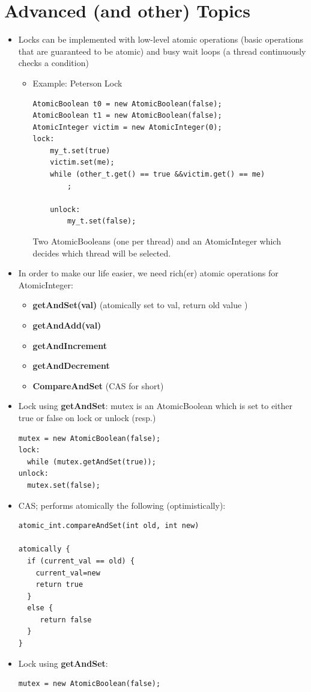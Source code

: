 \documentclass[a4paper]{article}
\begin{document}
\section{Advanced (and other) Topics}
\begin{itemize}
\item Locks can be implemented with low-level atomic operations (basic operations that are guaranteed to be atomic) and busy wait loops (a thread continuously checks a condition)
\begin{itemize}
\item Example: Peterson Lock
\begin{lstlisting}
AtomicBoolean t0 = new AtomicBoolean(false);
AtomicBoolean t1 = new AtomicBoolean(false);
AtomicInteger victim = new AtomicInteger(0);
lock:
    my_t.set(true)
    victim.set(me);
    while (other_t.get() == true &&victim.get() == me)
        ;
	
	unlock:
        my_t.set(false);
\end{lstlisting}
Two AtomicBooleans (one per thread) and an AtomicInteger which decides which thread will be selected.
\end{itemize}
\item In order to make our life easier, we need rich(er) atomic operations for AtomicInteger: 
\begin{itemize}
\item \textbf{getAndSet(val)} (atomically { set to val, return old value })
\item \textbf{getAndAdd(val)}
\item \textbf{getAndIncrement}
\item \textbf{getAndDecrement}
\item \textbf{CompareAndSet} (CAS for short)
\end{itemize}
\item Lock using \textbf{getAndSet}: mutex is an AtomicBoolean which is set to either true or false on lock or unlock (resp.)
\begin{lstlisting}
mutex = new AtomicBoolean(false);
lock:
  while (mutex.getAndSet(true));
unlock:
  mutex.set(false);
\end{lstlisting}
\item CAS; performs atomically the following (optimistically): 
\begin{lstlisting}
atomic_int.compareAndSet(int old, int new)

atomically {
  if (current_val == old) {
    current_val=new
    return true
  }
  else {
     return false
  }
}
\end{lstlisting}
\item Lock using \textbf{getAndSet}: 
\begin{lstlisting}
mutex = new AtomicBoolean(false);


\end{lstlisting}
\end{itemize}
\end{document}
